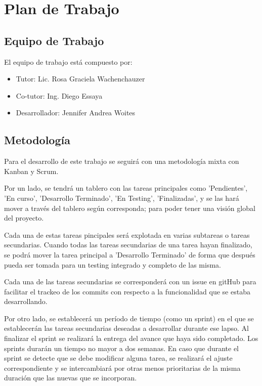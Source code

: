 \documentclass[a4paper]{article}
\begin{document}
\section{Plan de Trabajo}

\subsection{Equipo de Trabajo}

El equipo de trabajo está compuesto por:

\begin{itemize}
	\item Tutor: Lic. Rosa Graciela Wachenchauzer
	\item Co-tutor: Ing. Diego Essaya
	\item Desarrollador: Jennifer Andrea Woites
\end{itemize}

\subsection{Metodología}

Para el desarrollo de este trabajo se seguirá con una metodología mixta con Kanban y Scrum.

Por un lado, se tendrá un tablero con las tareas principales como 'Pendientes', 'En curso', 'Desarrollo Terminado', 'En Testing', 'Finalizadas', y se las hará mover a través del tablero según corresponda; para poder tener una visión global del proyecto.

Cada una de estas tareas pincipales será explotada en varias subtareas o tareas secundarias. Cuando todas las tareas secundarias de una tarea hayan finalizado, se podrá mover la tarea principal a 'Desarrollo Terminado' de forma que después pueda ser tomada para un testing integrado y completo de las misma.

Cada una de las tareas secundarias se corresponderá con un issue en gitHub para facilitar el trackeo de los commits con respecto a la funcionalidad que se estaba desarrollando.

Por otro lado, se establecerá un período de tiempo (como un sprint) en el que se establecerán las tareas secundarias deseadas a desarrollar durante ese lapso. Al finalizar el sprint se realizará la entrega del avance que haya sido completado. Los sprints durarán un tiempo no mayor a dos semanas. En caso que durante el sprint se detecte que se debe modificar alguna tarea, se realizará el ajuste correspondiente y se intercambiará por otras menos prioritarias de la misma duración que las nuevas que se incorporan.
\end{document}
